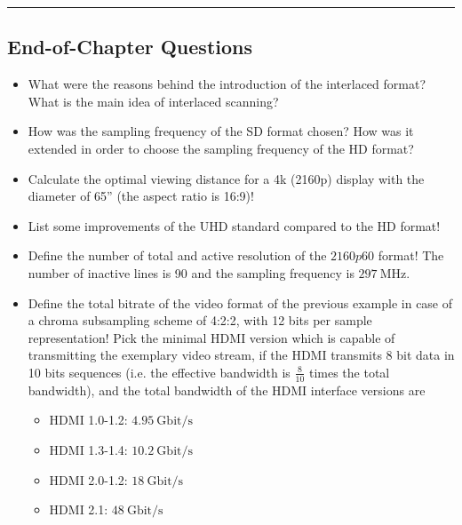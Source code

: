 

\vspace{2cm}
\noindent\rule{12cm}{0.4pt}

\subsection*{End-of-Chapter Questions}

\begin{itemize}
\item What were the reasons behind the introduction of the interlaced format?
What is the main idea of interlaced scanning?
%
\item How was the sampling frequency of the SD format chosen?
How was it extended in order to choose the sampling frequency of the HD format?
%
\item Calculate the optimal viewing distance for a 4k (2160p) display with the diameter of 65'' (the aspect ratio is 16:9)!
%
\item List some improvements of the UHD standard compared to the HD format!
%
\item Define the number of total and active resolution of the $2160p60$ format!
The number of inactive lines is 90 and the sampling frequency is $297~\mathrm{MHz}$.
%
\item Define the total bitrate of the video format of the previous example in case of a chroma subsampling scheme of 4:2:2, with 12 bits per sample representation!
Pick the minimal HDMI version which is capable of transmitting the exemplary video stream, if the HDMI transmits 8 bit data in 10 bits sequences (i.e. the effective bandwidth is $\frac{8}{10}$ times the total bandwidth), and the total bandwidth of the HDMI interface versions are
\begin{itemize}
\item HDMI 1.0-1.2: $4.95~\mathrm{Gbit/s}$
\item HDMI 1.3-1.4: $10.2~\mathrm{Gbit/s}$
\item HDMI 2.0-1.2: $18~\mathrm{Gbit/s}$
\item HDMI 2.1: $48~\mathrm{Gbit/s}$
\end{itemize}
\end{itemize}